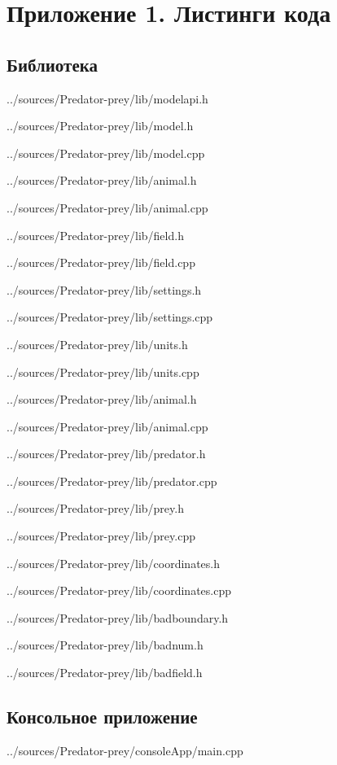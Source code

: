 \documentclass[a4paper]{article}
\begin{document}
\section{Приложение 1. Листинги кода}
\subsection{Библиотека}

{../sources/Predator-prey/lib/modelapi.h}
\newpage


{../sources/Predator-prey/lib/model.h}

{../sources/Predator-prey/lib/model.cpp}
\newpage


{../sources/Predator-prey/lib/animal.h}

{../sources/Predator-prey/lib/animal.cpp}
\newpage


{../sources/Predator-prey/lib/field.h}

{../sources/Predator-prey/lib/field.cpp}
\newpage


{../sources/Predator-prey/lib/settings.h}

{../sources/Predator-prey/lib/settings.cpp}
\newpage


{../sources/Predator-prey/lib/units.h}

{../sources/Predator-prey/lib/units.cpp}
\newpage


{../sources/Predator-prey/lib/animal.h}

{../sources/Predator-prey/lib/animal.cpp}
\newpage


{../sources/Predator-prey/lib/predator.h}

{../sources/Predator-prey/lib/predator.cpp}
\newpage


{../sources/Predator-prey/lib/prey.h}

{../sources/Predator-prey/lib/prey.cpp}
\newpage


{../sources/Predator-prey/lib/coordinates.h}

{../sources/Predator-prey/lib/coordinates.cpp}
\newpage


{../sources/Predator-prey/lib/badboundary.h}

{../sources/Predator-prey/lib/badnum.h}

{../sources/Predator-prey/lib/badfield.h}
\newpage

\subsection{Консольное приложение}


{../sources/Predator-prey/consoleApp/main.cpp}
\newpage
\end{document}
